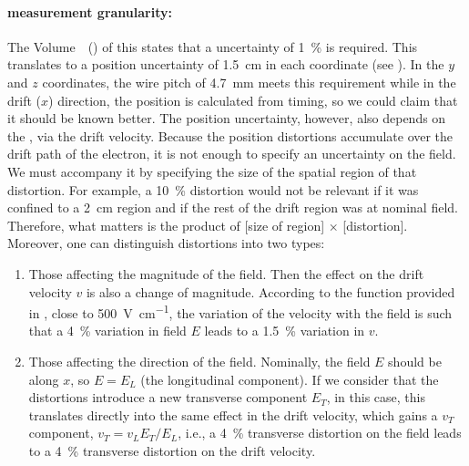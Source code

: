 \paragraph{\efield measurement granularity:}

The Volume~\volnumberphysics~(\voltitlephysics) of this  states that a  uncertainty of \SI{1}{\%} is required. 
This translates to a position uncertainty of \SI{1.5}{\cm} in each coordinate %
(see  \spchapa). In the $y$ and $z$ coordinates, the wire pitch of \SI{4.7}{\mm} meets this requirement while in the drift ($x$) direction, the position is calculated from timing, so we could claim that it should be known better.
The position uncertainty, however, also depends on the \efield, via the drift velocity. Because the position distortions accumulate over the drift path of the electron, it is not enough to specify an uncertainty on the field. We must accompany it by specifying the size of the spatial region of that distortion. For example, a \SI{10}{\%} distortion would not be relevant if it was confined to a \SI{2}{\cm} region and if the rest of the drift region was at nominal field.
Therefore, what matters is the product of [size of region] $\times$ [distortion]. Moreover, one can distinguish distortions into two types:
\begin{enumerate}
\item Those affecting the magnitude of the field. Then the effect on the drift velocity $v$ is also a change of magnitude. According to the function provided in \cite{Walkowiak:2000wf}, close to \SI{500}{\V\per\cm}, the variation of the velocity with the field is such that a \SI{4}{\%} variation in field $E$ leads to a \SI{1.5}{\%} variation in $v$.
\item Those affecting the direction of the field. Nominally, the field $E$ should be along $x$, so $E = E_L$ (the longitudinal component). If we consider that the distortions introduce a new transverse component $E_T$, in this case, this translates directly into the same effect in the drift velocity, which gains a $v_T$ component, $v_T=v_L  E_T/E_L $, i.e., a \SI{4}{\%} transverse distortion on the field leads to a \SI{4}{\%} transverse distortion on the drift velocity.
\end{enumerate}

